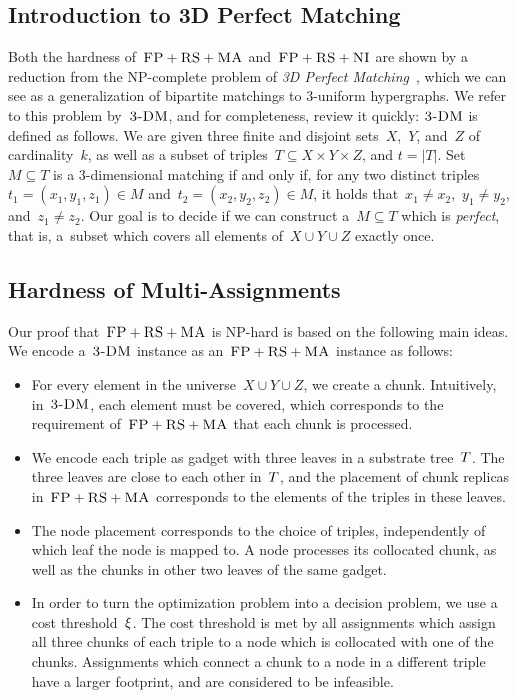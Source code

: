 \subsection{Introduction to 3D Perfect Matching}
\label{sec:3dm_intro}

Both the hardness of~$\textsc{FP}+\textsc{RS}+\textsc{MA}$ and~$\textsc{FP}+\textsc{RS}+\textsc{NI}$ are shown by a reduction
from the NP-complete problem of \emph{3D Perfect Matching}~\cite{3dmatch},
which we can see as a generalization of bipartite matchings to 3-uniform
hypergraphs. We refer to this problem by~$\textsc{3-DM}$, and for completeness,
review it quickly:
$\textsc{3-DM}$ is defined as follows. We are given three finite and disjoint
sets~$X$,~$Y$, and~$Z$ of cardinality~$k$, as well as a subset of triples~$T\subseteq
X \times Y \times Z$, and $t=|T|$.  Set~$M \subseteq T$ is a 3-dimensional matching
if and only if, for any two distinct triples~$t_1=(x_1, y_1, z_1) \in M$
and~$t_2=(x_2, y_2, z_2) \in M$, it holds that~$x_1\neq x_2$,~$y_1\neq
y_2$, and~$z_1\neq z_2$. Our goal is to decide if we can construct
a~$M \subseteq T$ which is \emph{perfect}, that is, a~subset which covers all
elements of~$X \cup Y \cup Z$ exactly once.


\subsection{Hardness of Multi-Assignments}\label{ssec:fprsma}

Our proof that~$\textsc{FP}+\textsc{RS}+\textsc{MA}$ is NP-hard is based on the following main ideas.
We encode a~$\textsc{3-DM}$ instance as an~$\textsc{FP}+\textsc{RS}+\textsc{MA}$ instance as follows:

 \begin{itemize}
 \item For every element in the universe~$X\cup Y\cup
 Z$, we create a chunk. Intuitively, in~$\textsc{3-DM}$,
 each element must be covered, which corresponds to the requirement
 of~$\textsc{FP}+\textsc{RS}+\textsc{MA}$
 that each chunk is processed.

 \item We encode each triple as gadget with three leaves in
 a substrate tree~$T$. The three leaves are close to each
 other in~$T$, and the placement of chunk replicas in~$\textsc{FP}+\textsc{RS}+\textsc{MA}$
 corresponds to the elements of the
 triples in these leaves.

 \item The node placement corresponds to the choice of triples,
 independently of which
leaf the node is mapped to.
 A node processes its collocated chunk,
 as well as the chunks in other two leaves of the same gadget.

\item In order to turn the optimization problem into a decision problem, we use
a cost threshold~$\xi$. The cost threshold is met by all
assignments which assign all three chunks of each triple to a
node which is collocated with one of the chunks. Assignments which connect a
chunk to a node in a different triple have a larger footprint, and are
considered to be infeasible.

\end{itemize}


